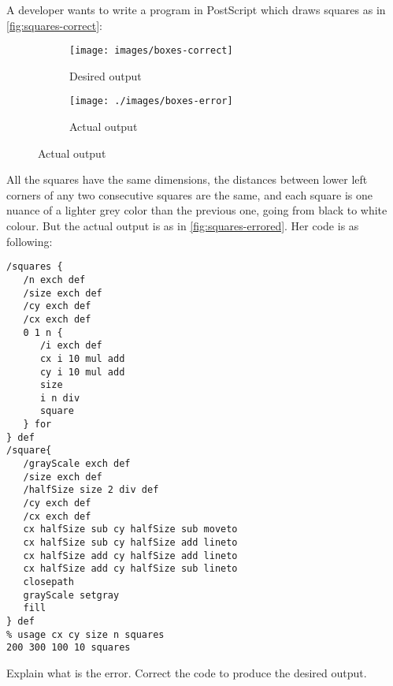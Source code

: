 A  developer wants to write a program in PostScript which draws squares as in \autoref{fig:squares-correct}: 
\begin{figure}[h]
\centering
\begin{subfigure}{.5\textwidth}
  \centering
  \texttt{[image: images/boxes-correct]}
  \caption{Desired output}
  \label{fig:squares-correct}
\end{subfigure}%
\begin{subfigure}{.5\textwidth}
  \centering
  \texttt{[image: ./images/boxes-error]}
  \caption{Actual output}
  \label{fig:squares-errored}
\end{subfigure}
\end{figure}

\noindent
All the squares have the same dimensions, the distances between lower left corners of any two consecutive squares are the same, and each square is one nuance of a lighter grey color than the previous one, going from black to white colour. But the actual output is as in \autoref{fig:squares-errored}. Her code is as following:

\begin{small}
\begin{verbatim}
/squares {
   /n exch def
   /size exch def
   /cy exch def
   /cx exch def
   0 1 n {
      /i exch def
      cx i 10 mul add
      cy i 10 mul add
      size
      i n div
      square
   } for
} def
/square{
   /grayScale exch def
   /size exch def
   /halfSize size 2 div def
   /cy exch def
   /cx exch def
   cx halfSize sub cy halfSize sub moveto
   cx halfSize sub cy halfSize add lineto
   cx halfSize add cy halfSize add lineto
   cx halfSize add cy halfSize sub lineto
   closepath
   grayScale setgray
   fill
} def
% usage cx cy size n squares
200 300 100 10 squares
\end{verbatim}
\end{small}

\noindent
Explain what is the error. Correct the code to produce the desired output.